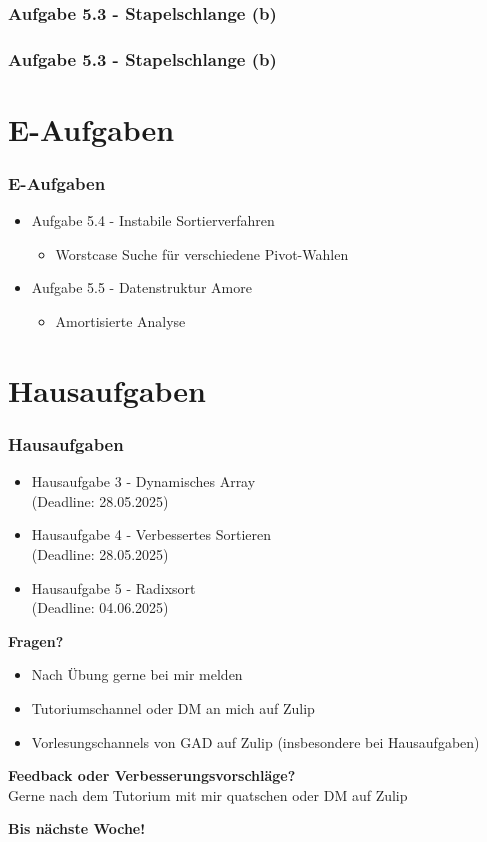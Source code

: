 \documentclass{beamer}
\begin{document}
\begin{frame}
	\frametitle{Aufgabe 5.3 - Stapelschlange (b)}
\end{frame}

\begin{frame}
	\frametitle{Aufgabe 5.3 - Stapelschlange (b)}
\end{frame}

\section{E-Aufgaben}
\begin{frame}
	\frametitle{E-Aufgaben}
	\begin{itemize}
		\item Aufgabe 5.4 - Instabile Sortierverfahren \\
		      \begin{itemize}
			      \item Worstcase Suche für verschiedene Pivot-Wahlen
		      \end{itemize}
		\item Aufgabe 5.5 - Datenstruktur Amore \\
		      \begin{itemize}
			      \item Amortisierte Analyse
		      \end{itemize}
	\end{itemize}
\end{frame}

\section{Hausaufgaben}
\begin{frame}
	\frametitle{Hausaufgaben}
	\begin{itemize}
		\item Hausaufgabe 3 - Dynamisches Array \\
		      (Deadline: 28.05.2025)
		\item Hausaufgabe 4 - Verbessertes Sortieren \\
		      (Deadline: 28.05.2025)
		\item Hausaufgabe 5 - Radixsort \\
		      (Deadline: 04.06.2025)
	\end{itemize}
\end{frame}

\begin{frame}
	\textbf{Fragen?}
	\begin{itemize}
		\item Nach Übung gerne bei mir melden
		\item Tutoriumschannel oder DM an mich auf Zulip
		\item Vorlesungschannels von GAD auf Zulip (insbesondere bei Hausaufgaben)
	\end{itemize}

	\medskip
	\textbf{Feedback oder Verbesserungsvorschläge?} \\
	Gerne nach dem Tutorium mit mir quatschen oder DM auf Zulip

	\medskip
	\textbf{Bis nächste Woche!}
\end{frame}

\end{document}
